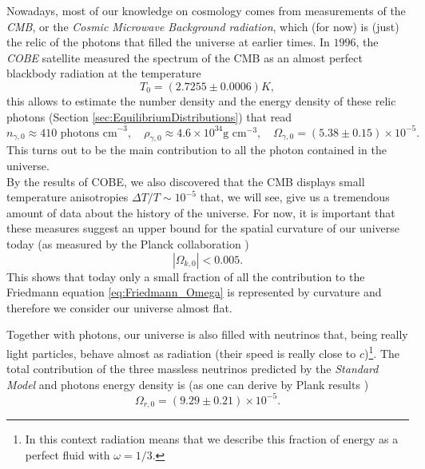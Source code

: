 Nowadays, most of our knowledge on cosmology comes from measurements of the \emph{CMB}, or the \emph{Cosmic Microwave Background radiation}, which (for now) is (just) the relic of the photons that filled the universe at earlier times. In $1996$, the \emph{COBE} satellite \cite{COBE1996} measured the spectrum of the CMB as an almost perfect blackbody radiation at the temperature 
\begin{equation}
    \label{eq:T0_CMB}
    T_0=(2.7255\pm0.0006)K,
\end{equation}
this allows to estimate the number density and the energy density of these relic photons (Section \ref{sec:EquilibriumDistributions}) that read
\begin{equation}
    n_{\gamma,0}\approx410\text{ photons cm}^{-3},\quad \rho_{\gamma, 0}\approx4.6\times10^{34}\text{g cm}^{-3},\quad\Omega_{\gamma,0}=(5.38\pm0.15)\times10^{-5}.
\end{equation}
This turns out to be the main contribution to all the photon contained in the universe.\\
By the results of COBE, we also discovered that the CMB displays small temperature anisotropies $\Delta T/T\sim 10^{-5}$ that, we will see, give us a tremendous amount of data about the history of the universe. For now, it is important that these measures suggest an upper bound for the spatial curvature of our universe today (as measured by the Planck collaboration \cite{planck2018results})
\begin{equation}
    \label{eq:Omega_k0}|\Omega_{k,0}|<0.005.
\end{equation}
This shows that today only a small fraction of all the contribution to the Friedmann equation \eqref{eq:Friedmann_Omega} is represented by curvature and therefore we consider our universe almost flat. 

Together with photons, our universe is also filled with neutrinos that, being really light particles, behave almost as radiation (their speed is really close to $c$)\footnote{In this context radiation means that we describe this fraction of energy as a perfect fluid with $\omega=1/3$.}. The total contribution of the three massless neutrinos predicted by the \emph{Standard Model} and photons energy density is (as one can derive by Plank results \cite{planck2018results})  
\begin{equation}
    \Omega_{r,0}=(9.29\pm0.21)\times10^{-5}.
\end{equation}

